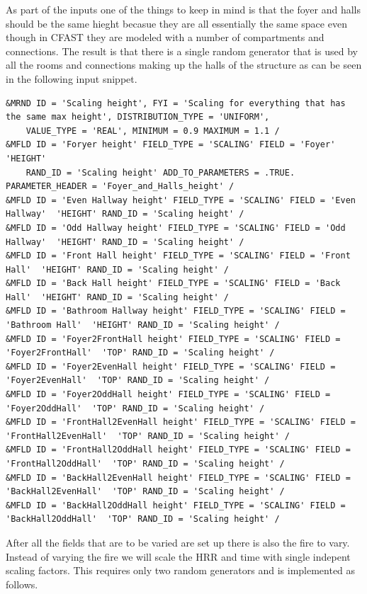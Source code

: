 \documentclass[12pt,twoside]{book}
\begin{document}
As part of the inputs one of the things to keep in mind is that the foyer and halls should be the same hieght becasue they are all essentially the same space even though in CFAST they are modeled with a number of compartments and connections. The result is that there is a single random generator that is used by all the rooms and connections making up the halls of the structure as can be seen in the following input snippet.


\vspace{\baselineskip}
\begin{lstlisting}
&MRND ID = 'Scaling height', FYI = 'Scaling for everything that has the same max height', DISTRIBUTION_TYPE = 'UNIFORM',
    VALUE_TYPE = 'REAL', MINIMUM = 0.9 MAXIMUM = 1.1 /
&MFLD ID = 'Foryer height' FIELD_TYPE = 'SCALING' FIELD = 'Foyer'  'HEIGHT'
    RAND_ID = 'Scaling height' ADD_TO_PARAMETERS = .TRUE. PARAMETER_HEADER = 'Foyer_and_Halls_height' /
&MFLD ID = 'Even Hallway height' FIELD_TYPE = 'SCALING' FIELD = 'Even Hallway'  'HEIGHT' RAND_ID = 'Scaling height' /
&MFLD ID = 'Odd Hallway height' FIELD_TYPE = 'SCALING' FIELD = 'Odd Hallway'  'HEIGHT' RAND_ID = 'Scaling height' /
&MFLD ID = 'Front Hall height' FIELD_TYPE = 'SCALING' FIELD = 'Front Hall'  'HEIGHT' RAND_ID = 'Scaling height' /
&MFLD ID = 'Back Hall height' FIELD_TYPE = 'SCALING' FIELD = 'Back Hall'  'HEIGHT' RAND_ID = 'Scaling height' /
&MFLD ID = 'Bathroom Hallway height' FIELD_TYPE = 'SCALING' FIELD = 'Bathroom Hall'  'HEIGHT' RAND_ID = 'Scaling height' /
&MFLD ID = 'Foyer2FrontHall height' FIELD_TYPE = 'SCALING' FIELD = 'Foyer2FrontHall'  'TOP' RAND_ID = 'Scaling height' /
&MFLD ID = 'Foyer2EvenHall height' FIELD_TYPE = 'SCALING' FIELD = 'Foyer2EvenHall'  'TOP' RAND_ID = 'Scaling height' /
&MFLD ID = 'Foyer2OddHall height' FIELD_TYPE = 'SCALING' FIELD = 'Foyer2OddHall'  'TOP' RAND_ID = 'Scaling height' /
&MFLD ID = 'FrontHall2EvenHall height' FIELD_TYPE = 'SCALING' FIELD = 'FrontHall2EvenHall'  'TOP' RAND_ID = 'Scaling height' /
&MFLD ID = 'FrontHall2OddHall height' FIELD_TYPE = 'SCALING' FIELD = 'FrontHall2OddHall'  'TOP' RAND_ID = 'Scaling height' /
&MFLD ID = 'BackHall2EvenHall height' FIELD_TYPE = 'SCALING' FIELD = 'BackHall2EvenHall'  'TOP' RAND_ID = 'Scaling height' /
&MFLD ID = 'BackHall2OddHall height' FIELD_TYPE = 'SCALING' FIELD = 'BackHall2OddHall'  'TOP' RAND_ID = 'Scaling height' /
\end{lstlisting}

After all the fields that are to be varied are set up there is also the fire to vary. Instead of varying the fire we will scale the HRR and time with single indepent scaling factors. This requires only two random generators and is implemented as follows.
\end{document}
